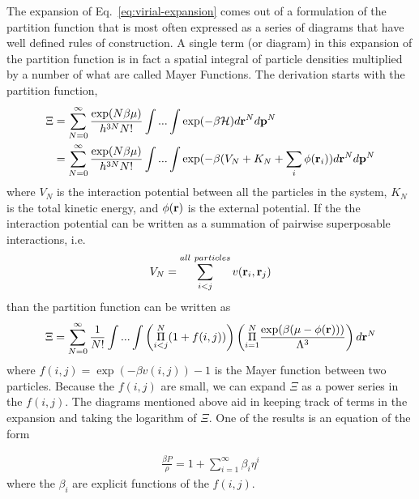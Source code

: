 The expansion of Eq.~\ref{eq:virial-expansion} comes out of a
formulation of the partition function that is most often expressed as
a series of diagrams that have well defined rules of construction.
A single term (or diagram) in this expansion of the partition function
is in fact a spatial integral of particle densities multiplied by a
number of what are called Mayer Functions.  The derivation starts with
the partition function,
\begin{align}
  \Xi &= \sum_{N=0}^{\infty}\frac{\exp(N\beta\mu)}{h^{3N}N!}\int...\int \exp(-\beta \mathcal{H})d\textbf{r}^Nd\mathbf{p}^N \\
  &=\sum_{N=0}^{\infty}\frac{\exp(N\beta\mu)}{h^{3N}N!}\int...\int \exp(-\beta (V_N + K_N + \sum_i\phi(\textbf{r}_i))d\textbf{r}^Nd\mathbf{p}^N
\end{align}
where $V_N$ is the interaction potential between all the particles in
the system, $K_N$ is the total kinetic energy, and $\phi(\textbf{r})$ is the
external potential.  If the the interaction potential can be written
as a summation of pairwise superposable interactions, i.e.
\begin{align}
  V_N = \sum_{i<j}^{all~particles} v(\textbf{r}_i,\textbf{r}_j)
\end{align}
 than the partition function can be written as
\begin{align}
  \Xi = \sum_{N=0}^{\infty}\frac{1}{N!}\int... \int \left(\overset{N}{\underset{i<j}{\Pi}} (1+f(i,j))\right)
  \left( \overset{N}{\underset{i=1}{\Pi}} \frac{\exp(\beta (\mu - \phi(\textbf{r})))}{\Lambda^3}\right)d\textbf{r}^N
\end{align}
where $f(i,j)=\exp(-\beta v(i,j))-1$ is the Mayer function between two
particles.  Because the $f(i,j)$ are small, we can expand $\Xi$ as a
power series in the $f(i,j)$. The diagrams mentioned above aid in
keeping track of terms in the expansion and taking the logarithm of
$\Xi$.  One of the results is an equation of the form

\begin{align}
  \frac{\beta P}{\rho} = 1 + \sum_{i=1}^{\infty}\beta_i\eta^i
\end{align}
where the $\beta_i$ are explicit functions of the $f(i,j)$.

